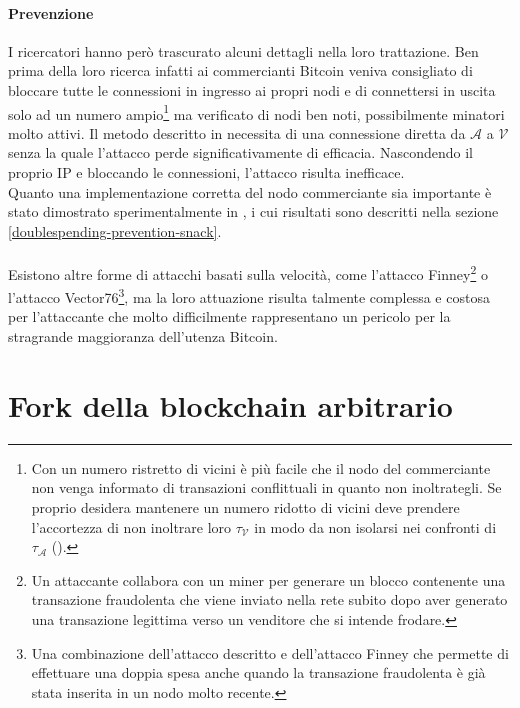 \paragraph{Prevenzione}

I ricercatori hanno però trascurato alcuni dettagli nella loro trattazione. Ben prima della loro ricerca infatti ai commercianti Bitcoin veniva consigliato di bloccare tutte le connessioni in ingresso ai propri nodi e di connettersi in uscita solo ad un numero ampio\footnote{Con un numero ristretto di vicini è più facile che il nodo del commerciante non venga informato di transazioni conflittuali in quanto non inoltrategli. Se proprio desidera mantenere un numero ridotto di vicini deve prendere l'accortezza di non inoltrare loro $\tau_\mathcal{V}$ in modo da non isolarsi nei confronti di $\tau_\mathcal{A}$  (\cite{bitcoinsnack}).} ma verificato di nodi ben noti, possibilmente minatori molto attivi. Il metodo descritto in \cite{doublespendig_fast} necessita di una connessione diretta da $\mathcal{A}$ a $\mathcal{V}$ senza la quale l'attacco perde significativamente di efficacia. Nascondendo il proprio IP e bloccando le connessioni, l'attacco risulta inefficace. \\ Quanto una implementazione corretta del nodo commerciante sia importante è stato dimostrato sperimentalmente in \cite{bitcoinsnack}, i cui risultati sono descritti nella sezione \ref{doublespending-prevention-snack}.\\\\
Esistono altre forme di attacchi basati sulla velocità, come l'attacco Finney\footnote{Un attaccante collabora con un miner per generare un blocco contenente una transazione fraudolenta che viene inviato nella rete subito dopo aver generato una transazione legittima verso un venditore che si intende frodare.} o l'attacco Vector76\footnote{Una combinazione dell'attacco descritto e dell'attacco Finney che permette di effettuare una doppia spesa anche quando la transazione fraudolenta è già stata inserita in un nodo molto recente.}, ma la loro attuazione risulta talmente complessa e costosa per l'attaccante che molto difficilmente rappresentano un pericolo per la stragrande maggioranza dell'utenza Bitcoin.

\section{Fork della blockchain arbitrario}\label{attacchi-hashrate}

